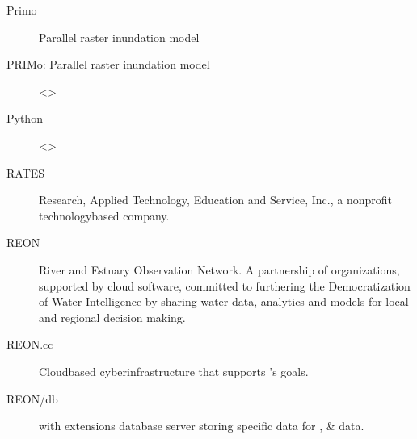 \documentclass[letterpaper,12pt,english]{book}
\begin{document}
\begin{description}
\item[{Primo\label{\detokenize{glossary:term-Primo}}}] \leavevmode
\sphinxAtStartPar
Parallel raster inundation model

\item[{PRIMo: Parallel raster inundation model\label{\detokenize{glossary:term-PRIMo-Parallel-raster-inundation-model}}}] \leavevmode
\sphinxAtStartPar
\textless{}\textgreater{}

\item[{Python\label{\detokenize{glossary:term-Python}}}] \leavevmode
\sphinxAtStartPar
\textless{}\textgreater{}

\item[{RATES\label{\detokenize{glossary:term-RATES}}}] \leavevmode
\sphinxAtStartPar
Research, Applied Technology, Education and Service, Inc., a non\sphinxhyphen{}profit technology\sphinxhyphen{}based company.

\item[{REON\label{\detokenize{glossary:term-REON}}}] \leavevmode
\sphinxAtStartPar
River and Estuary Observation Network. A partnership of organizations, supported by cloud software, committed to furthering the Democratization of Water Intelligence by sharing water data, analytics and models for local and regional decision making.

\item[{REON.cc\label{\detokenize{glossary:term-REON.cc}}}] \leavevmode
\sphinxAtStartPar
Cloud\sphinxhyphen{}based cyber\sphinxhyphen{}infrastructure that supports {\hyperref[\detokenize{glossary:term-REON}]{}}’s goals.

\item[{REON/db\label{\detokenize{glossary:term-REON-db}}}] \leavevmode
\sphinxAtStartPar
{\hyperref[\detokenize{glossary:term-PostgreSQL}]{}} with {\hyperref[\detokenize{glossary:term-PostGIS}]{}} extensions database server storing {\hyperref[\detokenize{glossary:term-REON}]{}} specific data for {\hyperref[\detokenize{glossary:term-RTHS}]{}}, {\hyperref[\detokenize{glossary:term-REON-WM}]{}} \& {\hyperref[\detokenize{glossary:term-REON.cc}]{}} data.


\end{description}
\end{document}
